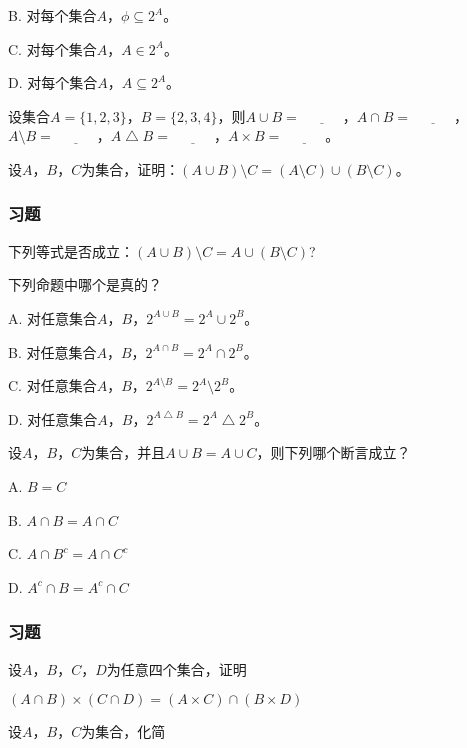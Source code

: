 \documentclass{beamer}
\begin{document}
\begin{CJK*}{UTF8}{gbsn}
\begin{frame}
\begin{Exercise}
    B. 对每个集合$A$，$\phi \subseteq 2^A$。

    C. 对每个集合$A$，$A \in 2^A$。

    D. 对每个集合$A$，$A \subseteq 2^A$。
  \end{Exercise}
  \begin{Exercise}
    设集合$A=\{1,2,3\}$，$B=\{2,3,4\}$，则$A\cup B=\underline{\quad\quad\quad}$，$A\cap B=\underline{\quad\quad\quad}$，$A\setminus B=\underline{\quad\quad\quad}$，$A\bigtriangleup B=\underline{\quad\quad\quad}$，$A\times B=\underline{\quad\quad\quad}$。
  \end{Exercise}
  \begin{Exercise}
   设$A$，$B$，$C$为集合，证明：$(A\cup B) \setminus C = (A\setminus C) \cup
   (B\setminus C)$。
  \end{Exercise}
\end{frame}
\begin{frame}
  \frametitle{习题}
    \begin{Exercise}
      下列等式是否成立：$(A\cup B) \setminus C = A \cup (B\setminus C)$?
    \end{Exercise}

  \begin{Exercise}
下列命题中哪个是真的？

A. 对任意集合$A$，$B$，$2^{A\cup B} = 2^A \cup 2^B$。

B. 对任意集合$A$，$B$，$2^{A\cap B} = 2^A \cap 2^B$。

C. 对任意集合$A$，$B$，$2^{A\setminus B} = 2^A \setminus 2^B$。

D. 对任意集合$A$，$B$，$2^{A\bigtriangleup B} = 2^A \bigtriangleup 2^B$。
  \end{Exercise}
  \begin{Exercise}
    设$A$，$B$，$C$为集合，并且$A\cup B = A \cup C$，则下列哪个断言成立？

    A. $B = C$

    B. $A \cap B = A \cap C$

    C. $A \cap B^c = A \cap C^c$

    D. $A^c \cap B = A^c \cap C$
  \end{Exercise}
\end{frame}
\begin{frame}
  \frametitle{习题}
  \begin{Exercise}
    设$A$，$B$，$C$，$D$为任意四个集合，证明

    $(A \cap B) \times (C \cap D) =
    (A\times C) \cap (B \times D)$
  \end{Exercise}
  \begin{Exercise}
   设$A$，$B$，$C$为集合，化简


\end{Exercise}
\end{frame}
\end{CJK*}
\end{document}
